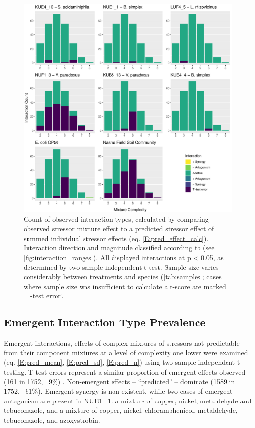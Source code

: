 \documentclass[final,1p,times]{elsarticle}
\begin{document}
\begin{figure}[hb]
    \centering
    \includegraphics[width = \textwidth]{Scripts/Results/Final_Pipeline/histogram_interaction_basic.pdf}
    \caption{Count of observed interaction types, calculated by comparing observed stressor mixture effect to a predicted stressor effect of summed individual stressor effects (eq. \ref{E:pred_effect_calc}). Interaction direction and magnitude classified according to \citet{Piggott2015} (see \cref{fig:interaction_ranges}). All displayed interactions at p < 0.05, as determined by two-sample independent t-test. Sample size varies considerably between treatments and species (\cref{tab:samples}; cases where sample size was insufficient to calculate a t-score are marked 'T-test error'.}
    \label{fig:histogram_interaction_basic}
\end{figure}

\newpage
\subsection{Emergent Interaction Type Prevalence}
\label{S:3:8}

Emergent interactions, effects of complex mixtures of stressors not predictable from their component mixtures at a level of complexity one lower were examined (eq. \ref{E:pred_mean}, \ref{E:pred_sd}, \ref{E:pred_n}) using two-sample independent t-testing. T-test errors represent a similar proportion of emergent effects observed (161 in 1752, ~9\%) . Non-emergent effects – “predicted” – dominate (1589 in 1752, ~91\%). Emergent synergy is non-existent, while two cases of emergent antagonism are present in NUE1\_1: a mixture of copper, nickel, metaldehyde and tebuconazole, and a mixture of copper, nickel, chloramphenicol, metaldehyde, tebuconazole, and azoxystrobin.
\end{document}
